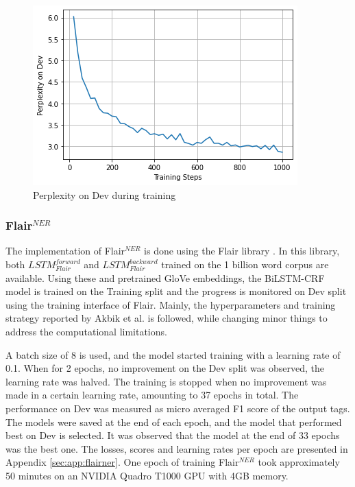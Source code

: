 \documentclass{report}
\theoremstyle{definition}
\theoremstyle{remark}
\begin{document}
\begin{figure}
    \centering
    \includegraphics[scale=0.7]{perpplot.png}
    \caption{Perplexity on Dev during training}
    \label{fig:perp}
\end{figure}

\subsubsection{Flair$^{NER}$}
The implementation of Flair$^{NER}$ is done using the Flair library \cite{flairlib}. In this library, both $LSTM^{forward}_{Flair}$ and $LSTM^{backward}_{Flair}$ trained on the 1 billion word corpus \cite{onebillion} are available. Using these and pretrained GloVe embeddings, the BiLSTM-CRF model is trained on the Training split and the progress is monitored on Dev split using the training interface of Flair.  Mainly, the hyperparameters and training strategy reported by Akbik et al. \cite{flairpaper} is followed, while changing minor things to address the computational limitations. 

A batch size of 8 is used, and the model started training with a learning rate of 0.1. When for 2 epochs, no improvement on the Dev split was observed, the learning rate was halved. The training is stopped when no improvement was made in a certain learning rate, amounting to 37 epochs in total. The performance on Dev was measured as micro averaged F1 score of the output tags. The models were saved at the end of each epoch, and the model that performed best on Dev is selected. It was observed that the model at the end of 33 epochs was the best one. The losses, scores and learning rates per epoch are presented in Appendix \ref{sec:app:flairner}. One epoch of training Flair$^{NER}$ took approximately 50 minutes on an NVIDIA Quadro T1000 GPU with 4GB memory. 
\end{document}
